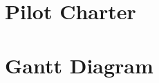 \documentclass[12pt, a4paper,twoside]{tesi_upf}
\begin{document}

\cleardoublepage

\appendix
\label{appendix}

  \chapter{Pilot Charter}
  
  \chapter{Gantt Diagram}
  
  


\backmatter
\printindex
\end{document}
